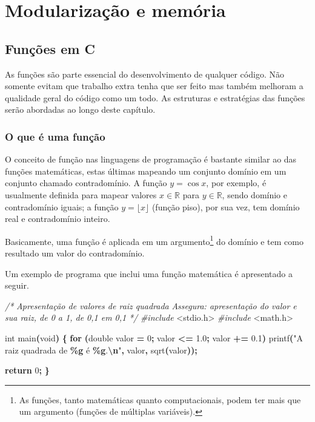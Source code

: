 \documentclass[
  11pt,
  a4paper,
]{scrbook}
\newenvironment{Shaded}{\begin{snugshade}}{\end{snugshade}}
\newcommand{\CommentTok}[1]{\textcolor[rgb]{0.56,0.35,0.01}{\textit{#1}}}
\newcommand{\ControlFlowTok}[1]{\textcolor[rgb]{0.13,0.29,0.53}{\textbf{#1}}}
\newcommand{\DataTypeTok}[1]{\textcolor[rgb]{0.13,0.29,0.53}{#1}}
\newcommand{\DecValTok}[1]{\textcolor[rgb]{0.00,0.00,0.81}{#1}}
\newcommand{\FloatTok}[1]{\textcolor[rgb]{0.00,0.00,0.81}{#1}}
\newcommand{\ImportTok}[1]{#1}
\newcommand{\NormalTok}[1]{#1}
\newcommand{\OperatorTok}[1]{\textcolor[rgb]{0.81,0.36,0.00}{\textbf{#1}}}
\newcommand{\PreprocessorTok}[1]{\textcolor[rgb]{0.56,0.35,0.01}{\textit{#1}}}
\newcommand{\SpecialCharTok}[1]{\textcolor[rgb]{0.81,0.36,0.00}{\textbf{#1}}}
\newcommand{\StringTok}[1]{\textcolor[rgb]{0.31,0.60,0.02}{#1}}
\begin{document}
\part{Modularização e memória}

\chapter{Funções em C}\label{sec-funcoes}

As funções são parte essencial do desenvolvimento de qualquer código.
Não somente evitam que trabalho extra tenha que ser feito mas também
melhoram a qualidade geral do código como um todo. As estruturas e
estratégias das funções serão abordadas ao longo deste capítulo.

\section{O que é uma função}\label{o-que-uxe9-uma-funuxe7uxe3o}

O conceito de função nas linguagens de programação é bastante similar ao
das funções matemáticas, estas últimas mapeando um conjunto domínio em
um conjunto chamado contradomínio. A função \({y = \cos x}\), por
exemplo, é usualmente definida para mapear valores
\({x \in \mathbb{R}}\) para \({y \in \mathbb{R}}\), sendo domínio e
contradomínio iguais; a função \({y = \lfloor x \rfloor}\) (função
piso), por sua vez, tem domínio real e contradomínio inteiro.

Basicamente, uma função é aplicada em um argumento\footnote{As funções,
  tanto matemáticas quanto computacionais, podem ter mais que um
  argumento (funções de múltiplas variáveis).} do domínio e tem como
resultado um valor do contradomínio.

Um exemplo de programa que inclui uma função matemática é apresentado a
seguir.

\begin{Shaded}
\begin{Highlighting}[]
\CommentTok{/*}
\CommentTok{Apresentação de valores de raiz quadrada}
\CommentTok{Assegura: apresentação do valor e sua raiz, de 0 a 1, de 0,1 em 0,1}
\CommentTok{*/}
\PreprocessorTok{\#include }\ImportTok{\textless{}stdio.h\textgreater{}}
\PreprocessorTok{\#include }\ImportTok{\textless{}math.h\textgreater{}}

\DataTypeTok{int}\NormalTok{ main}\OperatorTok{(}\DataTypeTok{void}\OperatorTok{)} \OperatorTok{\{}
    \ControlFlowTok{for} \OperatorTok{(}\DataTypeTok{double}\NormalTok{ valor }\OperatorTok{=} \DecValTok{0}\OperatorTok{;}\NormalTok{ valor }\OperatorTok{\textless{}=} \FloatTok{1.0}\OperatorTok{;}\NormalTok{ valor }\OperatorTok{+=} \FloatTok{0.1}\OperatorTok{)}
\NormalTok{        printf}\OperatorTok{(}\StringTok{"A raiz quadrada de }\SpecialCharTok{\%g}\StringTok{ é }\SpecialCharTok{\%g}\StringTok{.}\SpecialCharTok{\textbackslash{}n}\StringTok{"}\OperatorTok{,}\NormalTok{ valor}\OperatorTok{,}\NormalTok{ sqrt}\OperatorTok{(}\NormalTok{valor}\OperatorTok{));}

    \ControlFlowTok{return} \DecValTok{0}\OperatorTok{;}
\OperatorTok{\}}
\end{Highlighting}
\end{Shaded}
\end{document}
